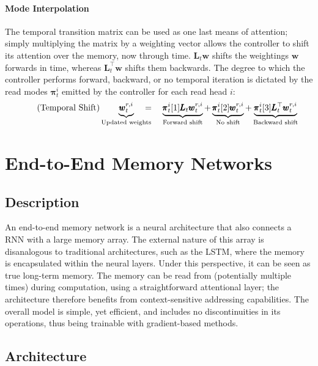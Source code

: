 \documentclass[]{article}
\begin{document}
\paragraph{Mode Interpolation} The temporal transition matrix can be used as one last means of attention; simply multiplying the matrix by a weighting vector allows the controller to shift its attention over the memory, now through time. $\pmb{L}_t \pmb{w}$ shifts the weightings $\pmb{w}$ forwards in time, whereas $\pmb{L}_t^\top \pmb{w}$ shifts them backwards. The degree to which the controller performs forward, backward, or no temporal iteration is dictated by the read modes $\pmb{\pi}_t^i$ emitted by the controller for each read head $i$:
\[
\tag{Temporal Shift}
\underbrace{\pmb{w}_t^{r,i}}_{\text{\scriptsize Updated weights}} \hspace{-10pt} = \quad
\underbrace{\pmb{\pi}_t^i[1] \pmb{L}_t\pmb{w}_t^{r,i}}_{\text{\scriptsize Forward shift}} + 
\underbrace{\pmb{\pi}_t^i[2] \pmb{w}_t^{r,i}}_{\text{\scriptsize No shift}} + 
\underbrace{\pmb{\pi}_t^i[3] \pmb{L}_t^\top \pmb{w}_t^{r,i}}_{\text{\scriptsize Backward shift}}
\]

\section{End-to-End Memory Networks}
\subsection{Description}
An end-to-end memory network is a neural architecture that also connects a RNN with a large memory array. The external nature of this array is disanalogous to traditional architectures, such as the LSTM, where the memory is encapsulated within the neural layers. Under this perspective, it can be seen as true long-term memory. The memory can be read from (potentially multiple times) during computation, using a straightforward attentional layer; the architecture therefore benefits from context-sensitive addressing capabilities. The overall model is simple, yet efficient, and includes no discontinuities in its operations, thus being trainable with gradient-based methods.

\subsection{Architecture}
\end{document}
